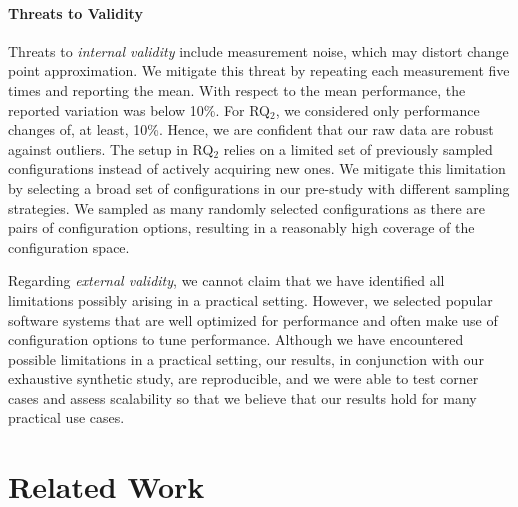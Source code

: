 \documentclass[sigconf, screen]{acmart}
\begin{document}
	\paragraph{Threats to Validity}
	Threats to \emph{internal validity} include measurement noise, which may distort change point approximation. We mitigate this threat by repeating each measurement five times and reporting the mean. With respect to the mean performance, the reported variation was below 10\%. For RQ$_2$, we considered only performance changes of, at least, 10\%. 
	Hence, we are confident that our raw data are robust against outliers. The setup in RQ$_2$ relies on a limited set of previously sampled configurations instead of actively acquiring new ones. We mitigate this limitation by selecting a broad set of configurations in our pre-study with different sampling strategies. We sampled as many randomly selected configurations as there are pairs of configuration options, resulting in a reasonably high coverage of the configuration space. 
	
	Regarding \emph{external validity}, we cannot claim that we have identified all limitations possibly arising in a practical setting. However, we selected popular software systems that are well optimized for performance and often make use of configuration options to tune performance.  Although we have encountered possible limitations in a practical setting, our results, in conjunction with our exhaustive synthetic study, are reproducible, and we were able to test corner cases and assess scalability so that we believe that our results hold for many practical use cases.
	
	\section{Related Work}\label{sec:rw}
\end{document}
